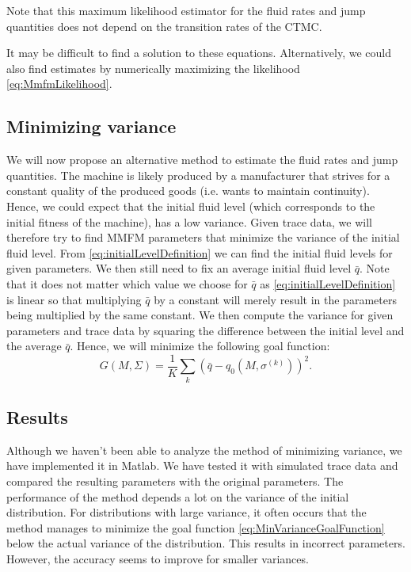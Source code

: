 \begin{remark}
	Note that this maximum likelihood estimator for the fluid rates and jump quantities does not depend on the transition rates of the CTMC.
\end{remark}

\begin{remark}
	It may be difficult to find a solution to these equations.
	Alternatively, we could also find estimates by numerically maximizing the likelihood \eqref{eq:MmfmLikelihood}. 
\end{remark}

\subsection{Minimizing variance}
We will now propose an alternative method to estimate the fluid rates and jump quantities.
The machine is likely produced by a manufacturer that strives for a constant quality of the produced goods (i.e. wants to maintain continuity).
Hence, we could expect that the initial fluid level (which corresponds to the initial fitness of the machine), has a low variance.
Given trace data, we will therefore try to find MMFM parameters that minimize the variance of the initial fluid level.
From \eqref{eq:initialLevelDefinition} we can find the initial fluid levels for given parameters.
We then still need to fix an average initial fluid level $\bar q$.
Note that it does not matter which value we choose for $\bar q$ as \eqref{eq:initialLevelDefinition} is linear so that multiplying $\bar q$ by a constant will merely result in the parameters being multiplied by the same constant.
We then compute the variance for given parameters and trace data by squaring the difference between the initial level and the average $\bar q$.
Hence, we will minimize the following goal function:
\begin{equation}\label{eq:MinVarianceGoalFunction}
G(M,\Sigma)=\frac1K\sum_k \left(\bar q - q_0\left(M,\sigma^{(k)}\right)\right)^2.
\end{equation}

\subsection{Results}
Although we haven't been able to analyze the method of minimizing variance, we have implemented it in Matlab.
We have tested it with simulated trace data and compared the resulting parameters with the original parameters.
The performance of the method depends a lot on the variance of the initial distribution.
For distributions with large variance, it often occurs that the method manages to minimize the goal function \eqref{eq:MinVarianceGoalFunction} below the actual variance of the distribution.
This results in incorrect parameters.
However, the accuracy seems to improve for smaller variances.